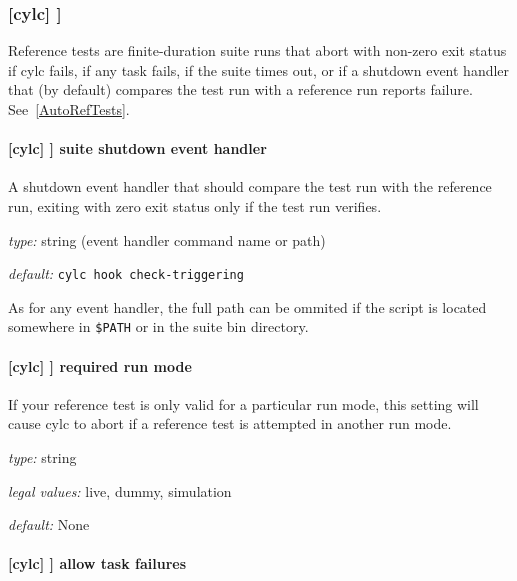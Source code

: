 \subsubsection[{[[}reference test{]]}]{[cylc] \textrightarrow [[reference test]] }
\label{ReferenceTestConfig}

Reference tests are finite-duration suite runs that abort with non-zero
exit status if cylc fails, if any task fails, if the suite times
out, or if a shutdown event handler that (by default) compares the test
run with a reference run reports failure. See~\ref{AutoRefTests}.

\paragraph[suite shutdown event handler]{[cylc] \textrightarrow [[reference test]] \textrightarrow suite shutdown event handler}

A shutdown event handler that should compare the test run with the
reference run, exiting with zero exit status only if the test run
verifies.

\begin{myitemize}
    \item {\em type:} string (event handler command name or path)
    \item {\em default:} \lstinline=cylc hook check-triggering=
\end{myitemize}
As for any event handler, the full path can be ommited if the script is
located somewhere in \lstinline=$PATH= or in the suite bin directory.

\paragraph[required run mode]{[cylc] \textrightarrow [[reference test]] \textrightarrow required run mode}

If your reference test is only valid for a particular run mode, this
setting will cause cylc to abort if a reference test is attempted
in another run mode.

\begin{myitemize}
    \item {\em type:} string
    \item {\em legal values:} live, dummy, simulation
    \item {\em default:} None
\end{myitemize}

\paragraph[allow task failures]{[cylc] \textrightarrow [[reference test]] \textrightarrow allow task failures}

